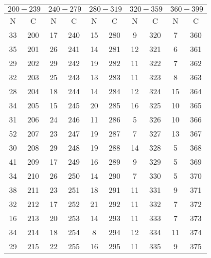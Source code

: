  \begin{table}
    \centering
    \caption{} 
    \label{}
    \begin{tabular}{c c || c c || c c || c c || c c}
        \midrule
        \multicolumn{2}{c}{$200-239$} & \multicolumn{2}{c}{$240-279$} & \multicolumn{2}{c}{$280-319$} & \multicolumn{2}{c}{$320-359$} & \multicolumn{2}{c}{$360-399$} \\
        \midrule
        N & C & N & C & N & C & N & C & N & C \\
        \midrule
33      &200 & 17   &   240  & 15      &     280  &   9       &  320 & 7        & 360 \\   
35      &201 & 26   &   241  & 14      &     281  &   12      &  321 & 6        & 361 \\  
29      &202 & 29   &   242  & 19      &     282  &   11      &  322 & 7        & 362 \\  
32      &203 & 25   &   243  & 13      &     283  &   11      &  323 & 8        & 363 \\  
28      &204 & 18   &   244  & 14      &     284  &   12      &  324 & 15       & 364 \\  
34      &205 & 15   &   245  & 20      &     285  &   16      &  325 & 10       & 365 \\  
31      &206 & 24   &   246  & 11      &     286  &   5       &  326 & 10       & 366 \\  
52      &207 & 23   &   247  & 19      &     287  &   7       &  327 & 13       & 367 \\  
30      &208 & 29   &   248  & 19      &     288  &   14      &  328 & 5        & 368 \\  
41      &209 & 17   &   249  & 16      &     289  &   9       &  329 & 5        & 369 \\  
34      &210 & 26   &   250  & 14      &     290  &   7       &  330 & 5        & 370 \\  
38      &211 & 23   &   251  & 18      &     291  &   11      &  331 & 9        & 371 \\  
32      &212 & 17   &   252  & 21      &     292  &   11      &  332 & 7        & 372 \\  
16      &213 & 20   &   253  & 14      &     293  &   11      &  333 & 7        & 373 \\  
34      &214 & 18   &   254  & 8       &     294  &   12      &  334 & 11       & 374 \\  
29      &215 & 22   &   255  & 16      &     295  &   11      &  335 & 9        & 375 \\  

\end{tabular}
\end{table}
